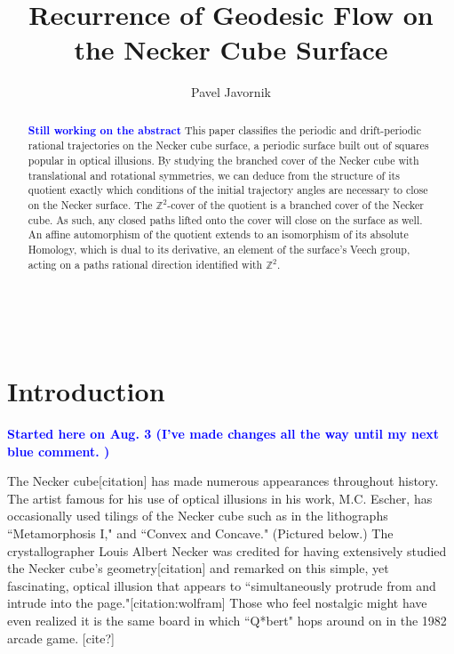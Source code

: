\documentclass[]{article}
\title{Recurrence of Geodesic Flow on the Necker Cube Surface}
\date{}
\author{Pavel Javornik}
\newcommand{\compav}[1]{\textbf{\textcolor{blue}{#1}}}
\begin{document}
\maketitle



\begin{center}

\\
\end{center}

\begin{abstract}
\compav{Still working on the abstract}
This paper classifies the periodic and drift-periodic rational trajectories on the Necker cube surface, a periodic surface built out of squares popular in optical illusions. By studying the branched cover of the Necker cube with translational and rotational symmetries, we can deduce from the structure of its quotient exactly which conditions of the initial trajectory angles are necessary to close on the Necker surface. The $\mathbb Z^2$-cover of the quotient is a branched cover of the Necker cube. As such, any closed paths lifted onto the cover will close on the surface as well. An affine automorphism of the quotient extends to an isomorphism of its absolute Homology, which is dual to its derivative, an element of the surface's Veech group, acting on a paths rational direction identified with $\mathbb{Z}^2$. 
\end{abstract}



\newpage
\section{Introduction}

\compav{Started here on Aug. 3 (I've made changes all the way until my next blue comment. )}

The Necker cube[citation] has made numerous appearances throughout history. The artist famous for his use of optical illusions in his work, M.C. Escher, has occasionally used tilings of the Necker cube such as in the lithographs ``Metamorphosis I," and ``Convex and Concave." (Pictured below.) The crystallographer Louis Albert Necker was credited for having extensively studied the Necker cube's geometry[citation] and remarked on this simple, yet fascinating, optical illusion that appears to ``simultaneously protrude from and intrude into the page."[citation:wolfram] Those who feel nostalgic might have even realized it is the same board in which ``Q*bert" hops around on in the 1982 arcade game. [cite?]
\end{document}
